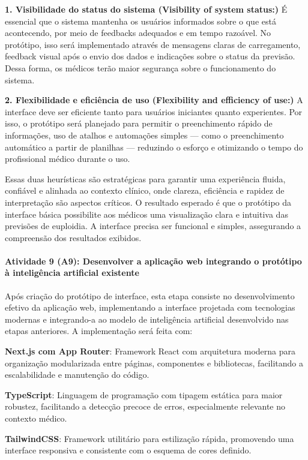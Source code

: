 \textbf{1. Visibilidade do status do sistema (Visibility of system status:)} É essencial que o sistema mantenha os usuários informados sobre o que está acontecendo, por meio de feedbacks adequados e em tempo razoável. No protótipo, isso será implementado através de mensagens claras de carregamento, feedback visual após o envio dos dados e indicações sobre o status da previsão. Dessa forma, os médicos terão maior segurança sobre o funcionamento do sistema.

\textbf{2. Flexibilidade e eficiência de uso (Flexibility and efficiency of use:)} A interface deve ser eficiente tanto para usuários iniciantes quanto experientes. Por isso, o protótipo será planejado para permitir o preenchimento rápido de informações, uso de atalhos e automações simples — como o preenchimento automático a partir de planilhas — reduzindo o esforço e otimizando o tempo do profissional médico durante o uso.

Essas duas heurísticas são estratégicas para garantir uma experiência fluida, confiável e alinhada ao contexto clínico, onde clareza, eficiência e rapidez de interpretação são aspectos críticos. O resultado esperado é que o protótipo da interface básica possibilite aos médicos uma visualização clara e intuitiva das previsões de euploidia. A interface precisa ser funcional e simples, assegurando a compreensão dos resultados exibidos.

\paragraph{\textbf{Atividade 9 (A9):}  Desenvolver a aplicação web integrando o protótipo à inteligência artificial existente}

Após criação do protótipo de interface, esta etapa consiste no desenvolvimento efetivo da aplicação web, implementando a interface projetada com tecnologias modernas e integrando-a ao modelo de inteligência artificial desenvolvido nas etapas anteriores. A implementação será feita com:

\textbf{Next.js com App Router}: Framework React com arquitetura moderna para organização modularizada entre páginas, componentes e bibliotecas, facilitando a escalabilidade e manutenção do código.

\textbf{TypeScript}: Linguagem de programação com tipagem estática para maior robustez, facilitando a detecção precoce de erros, especialmente relevante no contexto médico.

\textbf{TailwindCSS}: Framework utilitário para estilização rápida, promovendo uma interface responsiva e consistente com o esquema de cores definido.

